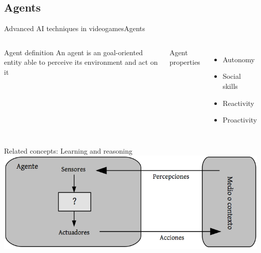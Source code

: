 \documentclass[10pt,compress]{beamer} %
\begin{document}
\subsection{Agents}
\begin{frame}{Advanced AI techniques in videogames}{Agents}
    \begin{columns}
	   \vspace{-0.8cm}
		\begin{block}{Agent definition}
		An agent is an goal-oriented entity able to perceive its environment and act on it
		\end{block}
		Agent properties
		\begin{itemize}
		\item Autonomy
		\item Social skills
		\item Reactivity
		\item Proactivity
		\end{itemize}
	\end{columns}
		Related concepts: Learning and reasoning\\
		\vspace{0.5cm}
		\centering\includegraphics[width=0.7\linewidth]{figs/agent}\\
\end{frame}
\end{document}
